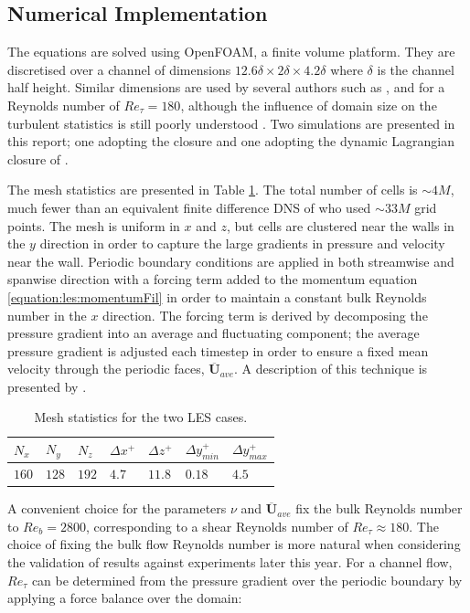 \documentclass[12pt,oneside,a4paper]{article}
\newcommand{\vect}[1]{\boldsymbol{#1}}
\begin{document}
\subsection{Numerical Implementation}
The equations are solved using OpenFOAM, a finite volume platform. They are discretised over a channel of dimensions $12.6\delta \times 2\delta \times 4.2\delta $ where $\delta$ is the channel half height. Similar dimensions are used by several authors such as \cite{moser1999}, and \cite{vreman2014} for a Reynolds number of $Re_\tau = 180$, although the influence of domain size on the turbulent statistics is still poorly understood \citep{vreman2014}. Two simulations are presented in this report; one adopting the \cite{smagorinsky1963} closure and one adopting the dynamic Lagrangian closure of \cite{meneveau1996}.

The mesh statistics are presented in Table \ref{table:meshStatistics}. The total number of cells is $\sim 4M$, much fewer than an equivalent finite difference DNS of \cite{vreman2014} who used $\sim 33M$ grid points. The mesh is uniform in $x$ and $z$, but cells are clustered near the walls in the $y$ direction in order to capture the large gradients in pressure and velocity near the wall. Periodic boundary conditions are applied in both streamwise and spanwise direction with a forcing term added to the momentum equation \eqref{equation:les:momentumFil} in order to maintain a constant bulk Reynolds number in the $x$ direction. The forcing term is derived by decomposing the pressure gradient into an average and fluctuating component; the average pressure gradient is adjusted each timestep in order to ensure a fixed mean velocity through the periodic faces, $ \overline{\vect{U}}_{ave} $. A description of this technique is presented by \cite{murthy1997}.
\begin{table}[!b]
\centering
\caption{Mesh statistics for the two LES cases.}
\label{table:meshStatistics}
\begin{tabular}{|l|l|l|l|l|l|l|}
\hline
$N_x$  & $N_y$  & $N_z$  & $\Delta x^+$ & $\Delta z^+$ & $\Delta y^+_{min}$ & $\Delta y^+_{max}$ \\ \hline
$160$ & $128$ & $192$ & $4.7$     & $11.8$    & $0.18$           & $4.5          $ \\ \hline
\end{tabular}
\end{table}
 A convenient choice for the parameters $\nu$ and $ \overline{\vect{U}}_{ave} $ fix the bulk Reynolds number to $Re_b = 2800$, corresponding to a shear Reynolds number of $Re_\tau \approx 180$. The choice of fixing the bulk flow Reynolds number is more natural when considering the validation of results against experiments later this year. For a channel flow, $Re_\tau$ can be determined from the pressure gradient over the periodic boundary by applying a force balance over the domain:
\end{document}
